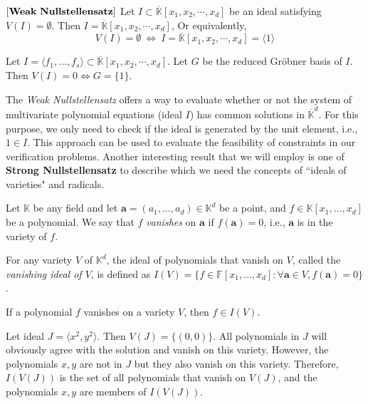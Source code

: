 \begin{Theorem}
$\left[\bf{Weak\  Nullstellensatz}\right]$ Let $I \subset \overline {\mathbb{K}}[x_1, x_2, \cdots, x_d]$ be an ideal satisfying $V(I)=\emptyset$. 
Then $I=\overline {\mathbb{K}}[x_1, x_2, \cdots, x_d]$, Or equivalently, 
\begin{equation}
V(I)=\emptyset\ \iff\ I=\overline {\mathbb{K}}[x_1, x_2, \cdots, x_d]=\langle 1 \rangle 
\end{equation}
\end{Theorem}

\begin{Corollary}
	Let $I=\langle f_{1},\dots,f_{s} \rangle \subset \overline {\mathbb{K}}[x_1, x_2, \cdots, x_d]$. 
	Let $G$ be the reduced Gr\"obner basis of $I$. Then $V(I)=0 \iff G=\{1\}$.
\end{Corollary}

The {\it Weak Nullstellensatz} offers a way to evaluate whether or not the system of multivariate polynomial equations (ideal $I$) has common solutions 
in ${\overline {\mathbb{K}}}^d$. For this purpose, we only need to check if the ideal is generated by the unit element, i.e., $1\in I$. 
This approach can be used to evaluate the feasibility of constraints in our verification problems. 
Another interesting result that we will employ is one of {\bf Strong Nullstellensatz} to describe which we need the concepts of ``ideals of varieties" and 
radicals.

Let $\mathbb{K}$ be any field and let $\mathbf{a}=(a_{1},\dots,a_{d}) \in \mathbb{K}^d$ be a point, and $f \in
\mathbb{K}[x_1,\dots, x_d]$ be a polynomial. We say that $f$ {\it vanishes} on $\mathbf{a}$ if $f(\mathbf{a}) = 0$, i.e.,
$\mathbf{a}$ is in the variety of $f$.

\begin{Definition}
For any variety $V$ of $\mathbb{K}^d$, the ideal of polynomials that vanish on $V$,
called the {\it vanishing ideal of $V$}, is defined as $I(V) = \{f\in
\mathbb{F}[x_1,\dots, x_d]: \forall \mathbf{a} \in V, f(\mathbf{a}) =
0\}$. 
\end{Definition}

\begin{Proposition}\label{pro:iofv}
	If a polynomial $f$ vanishes on a variety $V$, then $f \in I(V)$. 
\end{Proposition}


\begin{Example}
	Let ideal $J=\langle x^{2},y^{2}\rangle$. Then $V(J)=\{(0,0)\}$.
	All polynomials in $J$ will obviously agree with the solution and vanish on this variety.
	However, the polynomials $x,y$ are not in $J$ but they also vanish on this variety. 
	Therefore, $I(V(J))$ is the set of all polynomials that vanish on $V(J)$, and the polynomials
	$x,y$ are members of $I(V(J))$.
\end{Example}

